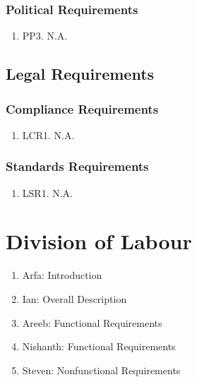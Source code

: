 \documentclass[]{article}
\begin{document}
\subsubsection{Political Requirements}
\begin{enumerate}
	\item PP3. N.A.
\end{enumerate}

\subsection{Legal Requirements}
\subsubsection{Compliance Requirements}
\begin{enumerate}
	\item LCR1. N.A.
\end{enumerate}

\subsubsection{Standards Requirements}
\begin{enumerate}
	\item LSR1. N.A.
\end{enumerate}

\appendix
\section{Division of Labour}
\label{sec:division_of_labour}
\begin{enumerate}
	\item Arfa: Introduction
	\item Ian: Overall Description
	\item Areeb: Functional Requirements
	\item Nishanth: Functional Requirements
	\item Steven: Nonfunctional Requirements
\end{enumerate}
\end{document}

